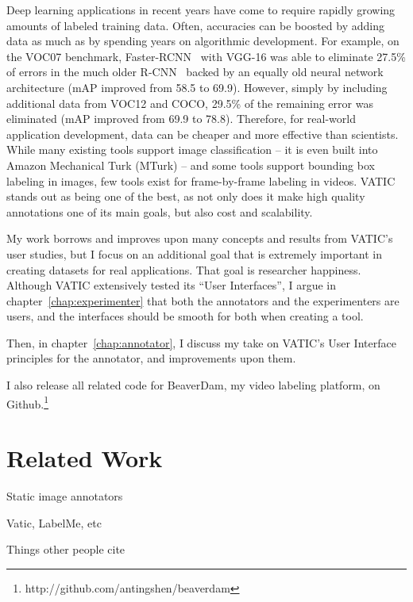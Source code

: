 Deep learning applications in recent years have come to require rapidly growing amounts of labeled training data.
Often, accuracies can be boosted by adding data as much as by spending years on algorithmic development.
For example, on the VOC07 benchmark, Faster-RCNN~\cite{FasterRCNN} with VGG-16 was able to eliminate 27.5\% of errors in the much older R-CNN~\cite{RCNN} backed by an equally old neural network architecture (mAP improved from 58.5 to 69.9). 
However, simply by including additional data from VOC12 and COCO, 29.5\% of the remaining error was eliminated (mAP improved from 69.9 to 78.8). 
Therefore, for real-world application development, data can be cheaper and more effective than scientists. 
While many existing tools support image classification -- it is even built into Amazon Mechanical Turk (MTurk) -- and some tools support bounding box labeling in images, few tools exist for frame-by-frame labeling in videos. 
VATIC~\cite{Vatic} stands out as being one of the best, as not only does it make high quality annotations one of its main goals, but also cost and scalability. 

My work borrows and improves upon many concepts and results from VATIC's user studies, but I focus on an additional goal that is extremely important in creating datasets for real applications. That goal is researcher happiness.
Although VATIC extensively tested its ``User Interfaces'', I argue in chapter~\ref{chap:experimenter} that both the annotators and the experimenters are users, and the interfaces should be smooth for both when creating a tool.

Then, in chapter~\ref{chap:annotator}, I discuss my take on VATIC's User Interface principles for the annotator, and improvements upon them.

I also release all related code for BeaverDam, my video labeling platform, on Github.\footnote{http://github.com/antingshen/beaverdam}

\section*{Related Work}
\label{sec:related}

Static image annotators

Vatic, LabelMe, etc

Things other people cite
